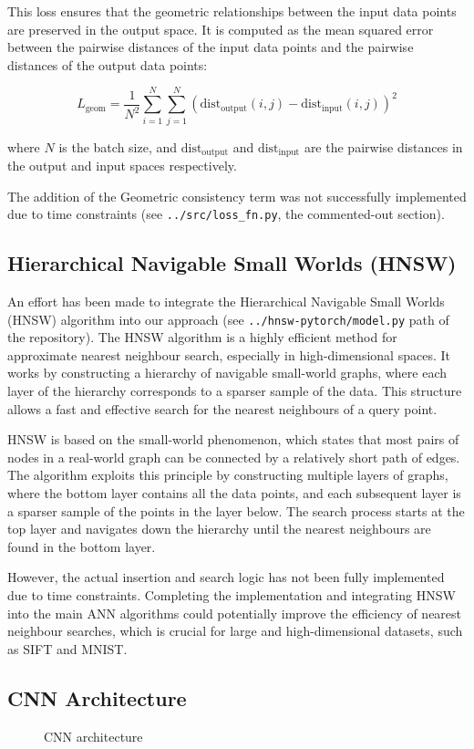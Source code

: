 \documentclass[sigconf, nonacm]{acmart}
\begin{document}
\begin{enumerate}
   This loss ensures that the geometric relationships between the input data points are preserved in the output space. It is computed as the mean squared error between the pairwise distances of the input data points and the pairwise distances of the output data points:

   \[ L_{\text{geom}} = \frac{1}{N^2} \sum_{i=1}^{N} \sum_{j=1}^{N} \left( \text{dist}_{\text{output}}(i, j) - \text{dist}_{\text{input}}(i, j) \right)^2 \]

   where \(N\) is the batch size, and \(\text{dist}_{\text{output}}\) and \(\text{dist}_{\text{input}}\) are the pairwise distances in the output and input spaces respectively.
\end{enumerate}

The addition of the Geometric consistency term was not successfully implemented due to time constraints (see \verb|../src/loss_fn.py|, the commented-out section).

\subsection{Hierarchical Navigable Small Worlds (HNSW)}

An effort has been made to integrate the Hierarchical Navigable Small Worlds (HNSW) algorithm into our approach (see \texttt{../hnsw-pytorch/model.py} path of the repository). The HNSW algorithm is a highly efficient method for approximate nearest neighbour search, especially in high-dimensional spaces. It works by constructing a hierarchy of navigable small-world graphs, where each layer of the hierarchy corresponds to a sparser sample of the data. This structure allows a fast and effective search for the nearest neighbours of a query point.

HNSW is based on the small-world phenomenon, which states that most pairs of nodes in a real-world graph can be connected by a relatively short path of edges. The algorithm exploits this principle by constructing multiple layers of graphs, where the bottom layer contains all the data points, and each subsequent layer is a sparser sample of the points in the layer below. The search process starts at the top layer and navigates down the hierarchy until the nearest neighbours are found in the bottom layer.

However, the actual insertion and search logic has not been fully implemented due to time constraints. Completing the implementation and integrating HNSW into the main ANN algorithms could potentially improve the efficiency of nearest neighbour searches, which is crucial for large and high-dimensional datasets, such as SIFT and MNIST.

\subsection{CNN Architecture}\label{sec:cnn}
\begin{figure}[!htb]
        \centering
        \resizebox{\textwidth}{!}{
        } %
        \caption{CNN architecture}
        \label{cnn}
\end{figure}
\end{document}
